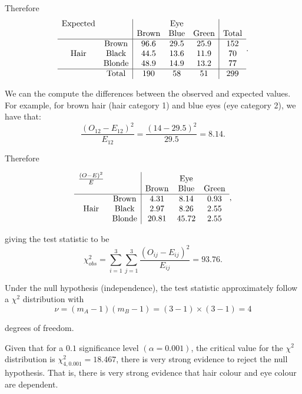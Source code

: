 \documentclass[
]{book}
\begin{document}
Therefore\\

\[  \begin{array}{cc|ccc|c} \mbox{Expected} &  &  & \mbox{Eye} &  \\ &  &  \mbox{Brown} &  \mbox{Blue} &  \mbox{Green} &  \mbox{Total}\\ \hline &  \mbox{Brown} &  96.6&  29.5 &  25.9&  152 \\ \mbox{Hair} &  \mbox{Black} &  44.5 &  13.6 &  11.9 &  70 \\ &  \mbox{Blonde} &  48.9 &  14.9 &  13.2 &  77 \\ \hline &  \mbox{Total} &  190 &  58 &  51 &  299 \end{array}. \]

We can the compute the differences between the observed and expected values.
For example, for brown hair (hair category 1) and blue eyes (eye category 2), we have that:\\

\[ \frac{(O_{12} - E_{12})^2}{E_{12}} = \frac{(14-29.5)^2}{29.5} = 8.14. \]

Therefore

\[  \begin{array}{cc|ccc} \frac{(O -E)^2}{E} &  &  & \mbox{Eye} \\ 
& &  \mbox{Brown} &  \mbox{Blue} &  \mbox{Green} \\ \hline &  \mbox{Brown} &  4.31 &  8.14 &  0.93 \\ \mbox{Hair} &  \mbox{Black} &  2.97 &  8.26 &  2.55 \\ &  \mbox{Blonde} &  20.81 &  45.72 &  2.55 \end{array},\]

giving the test statistic to be\\

\[ \chi_{obs}^2 = \sum_{i=1}^3 \sum_{j=1}^3 \frac{(O_{ij} - E_{ij})^2}{E_{ij}}= 93.76. \]

Under the null hypothesis (independence), the test statistic approximately follow a \(\chi^2\) distribution with\\

\[\nu = (m_A -1) (m_B-1) = (3-1)\times (3-1) =4 \]

degrees of freedom.

Given that for a \(0.1%
\) significance level \((\alpha=0.001)\), the critical value for the \(\chi^2\) distribution is \(\chi^2_{4, 0.001} =18.467\), there is very strong evidence to reject the null hypothesis. That is, there is very strong evidence that hair colour and eye colour are dependent.
\end{document}
